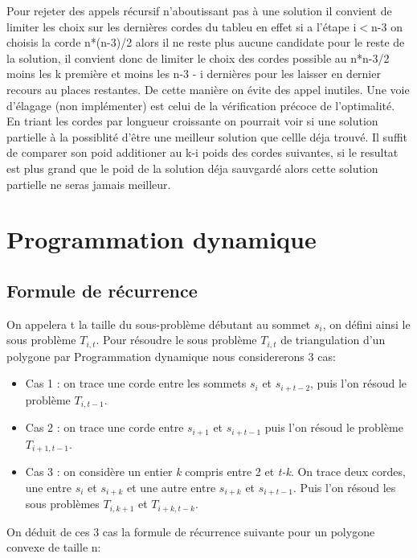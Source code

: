 \documentclass[a4paper,10pt]{article}
\begin{document}
Pour rejeter des appels récursif n'aboutissant pas à une solution il convient de limiter les choix sur les dernières cordes du tableu en effet si a l'étape i$<$n-3 on choisis la corde n*(n-3)/2 alors il ne reste plus aucune candidate pour le reste de la solution, il convient donc de limiter le choix des cordes possible au n*n-3/2 moins les k première et moins les n-3 - i dernières pour les laisser en dernier recours au places restantes. 
De cette manière on évite des appel inutiles.
Une voie d'élagage (non implémenter) est celui de la vérification précoce de l'optimalité.
En triant les cordes par longueur croissante on pourrait voir si une solution partielle à la possiblité d'être une meilleur solution que cellle déja trouvé.
Il suffit de comparer son poid additioner au k-i poids des cordes suivantes, si le resultat est plus grand que le poid de la solution déja sauvgardé alors cette solution partielle ne seras jamais meilleur.

 

\section{Programmation dynamique}

\subsection{Formule de récurrence}



On appelera t la taille du sous-problème débutant au sommet \(s_i\), on défini ainsi le sous problème \(T_{i,t}\).
Pour résoudre le sous problème \(T_{i,t}\) de triangulation d'un polygone par Programmation dynamique nous considererons 3 cas:

\begin{itemize}
 \item Cas 1 : on trace une corde entre les sommets \(s_i\) et \(s_{i+t-2}\), puis l'on résoud le problème \(T_{i,t-1}\).
 \item Cas 2 : on trace une corde entre \(s_{i+1}\) et \(s_{i+t-1}\) puis l'on résoud le problème \(T_{i+1,t-1}\).
 \item Cas 3 : on considère un entier \emph{k} compris entre 2 et \emph{t-k}. On trace deux cordes, une entre \(s_{i}\) et \(s_{i+k}\) et une autre entre \(s_{i+k}\) et \(s_{i+t-1}\).
 Puis l'on résoud les sous problèmes \(T_{i,k+1}\) et \(T_{i+k,t-k}\).
\end{itemize}

On déduit de ces 3 cas la formule de récurrence suivante pour un polygone convexe de taille n: 
\end{document}
